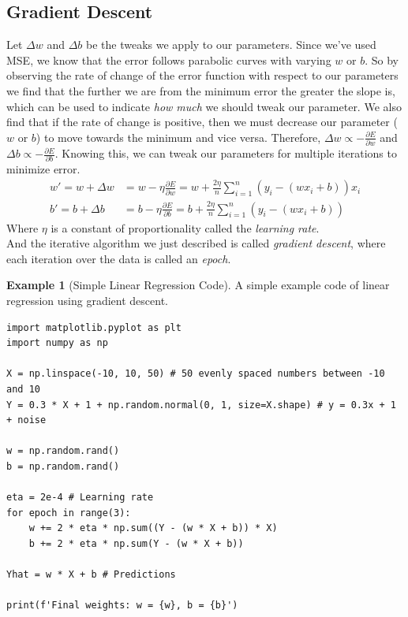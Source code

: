 \documentclass[a4paper]{article}
\theoremstyle{definition}
\newtheorem{example}{Example}
\begin{document}
\subsection{Gradient Descent}
Let $\Delta w$ and $\Delta b$ be the tweaks we apply to our parameters.
Since we've used MSE, we know that the error follows parabolic curves with varying $w$ or $b$.
So by observing the rate of change of the error function with respect to our parameters we find that the further we are from the minimum error the greater the slope is, which can be used to indicate \textit{how much} we should tweak our parameter.
We also find that if the rate of change is positive, then we must decrease our parameter ($w$ or $b$) to move towards the minimum and vice versa.
Therefore, $\Delta w \propto -\frac{\partial E}{\partial w}$ and $\Delta b \propto -\frac{\partial E}{\partial b}$.
Knowing this, we can tweak our parameters for multiple iterations to minimize error.
\begin{align*}
    w' = w + \Delta w &= w -\eta \frac{\partial E}{\partial w} = w + \frac{2\eta}{n} \sum_{i=1}^{n} (y_i - (wx_i + b))x_i \\
    b' = b + \Delta b &= b -\eta \frac{\partial E}{\partial b} = b + \frac{2\eta}{n} \sum_{i=1}^{n} (y_i - (wx_i + b))
\end{align*}
\noindent
Where $\eta$ is a constant of proportionality called the \textit{learning rate}.\\
And the iterative algorithm we just described is called \textit{gradient descent}, where each iteration over the data is called an \textit{epoch}.

\begin{example}[Simple Linear Regression Code]
    A simple example code of linear regression using gradient descent.
    \begin{lstlisting}
import matplotlib.pyplot as plt
import numpy as np

X = np.linspace(-10, 10, 50) # 50 evenly spaced numbers between -10 and 10
Y = 0.3 * X + 1 + np.random.normal(0, 1, size=X.shape) # y = 0.3x + 1 + noise

w = np.random.rand()
b = np.random.rand()

eta = 2e-4 # Learning rate
for epoch in range(3):
    w += 2 * eta * np.sum((Y - (w * X + b)) * X)
    b += 2 * eta * np.sum(Y - (w * X + b))

Yhat = w * X + b # Predictions

print(f'Final weights: w = {w}, b = {b}')
    \end{lstlisting}
\end{example}
\end{document}

